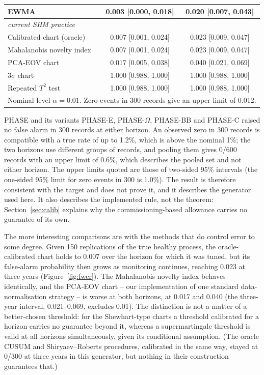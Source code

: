 \documentclass[12pt,a4paper]{article}
\newcommand{\rev}[1]{#1}
\newenvironment{revblock}{}{}
\newcommand{\rev}[1]{{\color{revcol}#1}}
\newenvironment{revblock}{\begingroup\color{revcol}}{\endgroup}
\begin{document}
\begin{table}[t]
\begin{revblock}
\begin{tabular}{lcc}
EWMA & 0.003 [0.000, 0.018] & 0.020 [0.007, 0.043] \\
\midrule
\multicolumn{3}{l}{\textit{current SHM practice}}\\
Calibrated chart (oracle) & 0.007 [0.001, 0.024] & 0.023 [0.009, 0.047] \\
Mahalanobis novelty index & 0.007 [0.001, 0.024] & 0.023 [0.009, 0.047] \\
PCA-EOV chart & 0.017 [0.005, 0.038] & 0.040 [0.021, 0.069] \\
$3\sigma$ chart & 1.000 [0.988, 1.000] & 1.000 [0.988, 1.000] \\
Repeated $T^2$ test & 1.000 [0.988, 1.000] & 1.000 [0.988, 1.000] \\
\midrule
\multicolumn{3}{l}{\footnotesize Nominal level $\alpha=0.01$. Zero events in 300 records give an upper limit of 0.012.} \\
\bottomrule
\end{tabular}
\end{revblock}
\end{table}

\begin{revblock}
PHASE and its variants PHASE-E, PHASE-$\Omega$, PHASE-BB and PHASE-C raised no false alarm in 300 records at either horizon. An observed zero in 300 records is compatible with a true rate of up to 1.2\%, which is above the nominal 1\%; the two horizons use different groups of records, and pooling them gives 0/600 records with an upper limit of 0.6\%, which describes the pooled set and not either horizon. The upper limits quoted are those of two-sided 95\% intervals (the one-sided 95\% limit for zero events in 300 is 1.0\%). The result is therefore consistent with the target and does not prove it, and it describes the generator used here. It also describes the implemented rule, not the theorem: Section~\ref{sec:calib} explains why the commissioning-based allowance carries no guarantee of its own.
\end{revblock}

The more interesting comparisons are with the methods that do control error to some degree. Given 150 replications of the true healthy process, the oracle-calibrated chart holds to 0.007 over the horizon for which it was tuned, but its false-alarm probability then grows as monitoring continues, reaching 0.023 at three years (Figure~\ref{fig:fwer}). The Mahalanobis novelty index behaves identically, and the PCA-EOV chart -- \rev{our implementation of one standard data-normalisation strategy} -- is worse at both horizons, at 0.017 and 0.040 \rev{(the three-year interval, 0.021--0.069, excludes 0.01)}. The distinction is not a matter of a better-chosen threshold: for the Shewhart-type charts a threshold calibrated for a horizon carries no guarantee beyond it, whereas a supermartingale threshold is valid at all horizons simultaneously, \rev{given its conditional assumption}. \rev{(The oracle CUSUM and Shiryaev--Roberts procedures, calibrated in the same way, stayed at 0/300 at three years in this generator, but nothing in their construction guarantees that.)}
\end{document}
